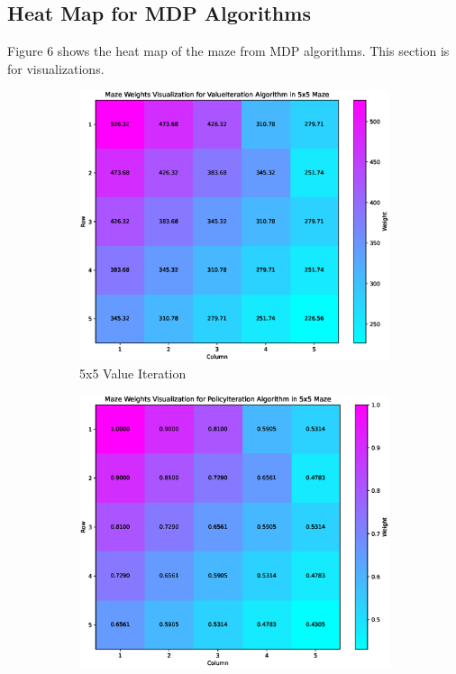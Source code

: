 \documentclass{article}
\begin{document}
\subsection{Heat Map for MDP Algorithms}
Figure 6 shows the heat map of the maze from MDP algorithms. This section is for visualizations.
\begin{figure}[hp]
    \centering
    \begin{subfigure}[b]{0.48\textwidth}
        \centering
        \includegraphics[width=\textwidth]{imgs/ValueIteration-5-5.eps}
        \caption{5x5 Value Iteration}
    \end{subfigure}
    \begin{subfigure}[b]{0.48\textwidth}
        \centering
        \includegraphics[width=\textwidth]{imgs/PolicyIteration-5-5.eps}

\end{subfigure}
\end{figure}
\end{document}
